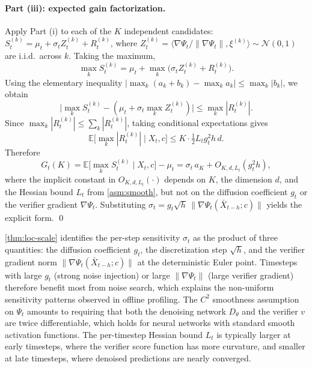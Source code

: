 \paragraph{Part (iii): expected gain factorization.}
Apply Part (i) to each of the $K$ independent candidates: $S_t^{(k)} = \mu_t + \sigma_t Z_t^{(k)} + R_t^{(k)}$, where $Z_t^{(k)} = \langle \nabla\Psi_t / \|\nabla\Psi_t\|, \xi^{(k)}\rangle \sim \mathcal{N}(0,1)$ are i.i.d.\ across $k$. Taking the maximum,
\[
  \max_k S_t^{(k)} = \mu_t + \max_k\bigl(\sigma_t Z_t^{(k)} + R_t^{(k)}\bigr).
\]
Using the elementary inequality $\bigl|\max_k(a_k + b_k) - \max_k a_k\bigr| \le \max_k |b_k|$, we obtain
\[
  \bigl|\max_k S_t^{(k)} - (\mu_t + \sigma_t \max_k Z_t^{(k)})\bigr| \le \max_k |R_t^{(k)}|.
\]
Since $\max_k |R_t^{(k)}| \le \sum_k |R_t^{(k)}|$, taking conditional expectations gives
\[
  \mathbb{E}\bigl[\max_k |R_t^{(k)}| \mid X_t, c\bigr] \le K \cdot \tfrac{1}{2} L_t g_t^2 h\,d.
\]
Therefore
\[
  G_t(K) = \mathbb{E}\bigl[\max_k S_t^{(k)} \mid X_t, c\bigr] - \mu_t = \sigma_t\,a_K + O_{K,d,L_t}(g_t^2 h),
\]
where the implicit constant in $O_{K,d,L_t}(\cdot)$ depends on $K$, the dimension $d$, and the Hessian bound $L_t$ from \cref{asm:smooth}, but not on the diffusion coefficient $g_t$ or the verifier gradient $\nabla\Psi_t$. Substituting $\sigma_t = g_t\sqrt{h}\,\|\nabla\Psi_t(\bar{X}_{t-h}; c)\|$ yields the explicit form. \qed
%
\begin{remark}
\cref{thm:loc-scale} identifies the per-step sensitivity $\sigma_t$ as the product of three quantities: the diffusion coefficient $g_t$, the discretization step $\sqrt{h}$, and the verifier gradient norm $\|\nabla\Psi_t(\bar{X}_{t-h}; c)\|$ at the deterministic Euler point. Timesteps with large $g_t$ (strong noise injection) or large $\|\nabla\Psi_t\|$ (large verifier gradient) therefore benefit most from noise search, which explains the non-uniform sensitivity patterns observed in offline profiling. The $C^2$ smoothness assumption on $\Psi_t$ amounts to requiring that both the denoising network $D_\theta$ and the verifier $v$ are twice differentiable, which holds for neural networks with standard smooth activation functions. The per-timestep Hessian bound $L_t$ is typically larger at early timesteps, where the verifier score function has more curvature, and smaller at late timesteps, where denoised predictions are nearly converged.
\end{remark}
%
